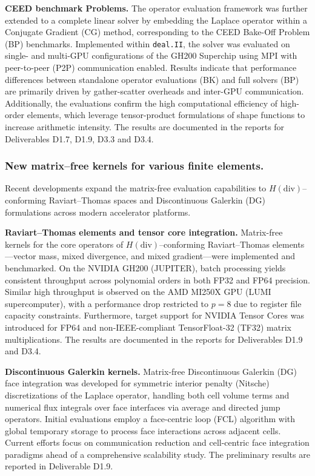 \documentclass[a4paper,12pt, numbers]{article}
\newcommand{\dealii}{\texttt{deal.II}}
\begin{document}
\noindent\textbf{CEED benchmark Problems.}
The operator evaluation framework was further extended to a complete linear solver by embedding the Laplace operator within a Conjugate Gradient (CG) method, corresponding to the CEED Bake-Off Problem (BP) benchmarks. Implemented within \dealii{}, the solver was evaluated on single- and multi-GPU configurations of the GH200 Superchip using MPI with peer-to-peer (P2P) communication enabled. Results indicate that performance differences between standalone operator evaluations (BK) and full solvers (BP) are primarily driven by gather-scatter overheads and inter-GPU communication. Additionally, the evaluations confirm the high computational efficiency of high-order elements, which leverage tensor-product formulations of shape functions to increase arithmetic intensity. The results are documented in the reports for Deliverables D1.7, D1.9, D3.3 and D3.4.


\subsubsection*{New matrix--free kernels for various finite elements.}

Recent developments expand the matrix-free evaluation capabilities to $H(\text{div})$--confor\-ming Raviart--Thomas spaces and Discontinuous Galerkin (DG) formulations across modern accelerator platforms.

\noindent\textbf{Raviart--Thomas elements and tensor core integration.}
Matrix-free kernels for the core operators of $H(\text{div})$--conforming Raviart--Thomas elements---vector mass, mixed divergence, and mixed gradient---were implemented and benchmarked. On the NVIDIA GH200 (JUPITER), batch processing yields consistent throughput across polynomial orders in both FP32 and FP64 precision. Similar high throughput is observed on the AMD MI250X GPU (LUMI supercomputer), with a performance drop restricted to $p=8$ due to register file capacity constraints. Furthermore, target support for NVIDIA Tensor Cores was introduced for FP64 and non-IEEE-compliant TensorFloat-32 (TF32) matrix multiplications. The results are documented in the reports for Deliverables D1.9 and D3.4.

\noindent\textbf{Discontinuous Galerkin kernels.}
Matrix-free Discontinuous Galerkin (DG) face integration was developed for symmetric interior penalty (Nitsche) discretizations of the Laplace operator, handling both cell volume terms and numerical flux integrals over face interfaces via average and directed jump operators. Initial evaluations employ a face-centric loop (FCL) algorithm with global temporary storage to process face interactions across adjacent cells. Current efforts focus on communication reduction and cell-centric face integration paradigms ahead of a comprehensive scalability study. The preliminary results are reported in Deliverable D1.9. 
\end{document}
